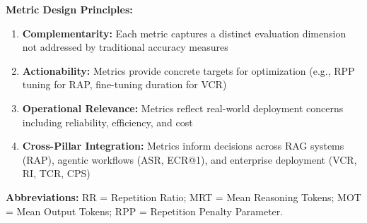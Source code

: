\textbf{Metric Design Principles:}

\begin{enumerate}[leftmargin=*]
    \item \textbf{Complementarity:} Each metric captures a distinct evaluation dimension not addressed by traditional accuracy measures
    \item \textbf{Actionability:} Metrics provide concrete targets for optimization (e.g., RPP tuning for RAP, fine-tuning duration for VCR)
    \item \textbf{Operational Relevance:} Metrics reflect real-world deployment concerns including reliability, efficiency, and cost
    \item \textbf{Cross-Pillar Integration:} Metrics inform decisions across RAG systems (RAP), agentic workflows (ASR, ECR@1), and enterprise deployment (VCR, RI, TCR, CPS)
\end{enumerate}

\textbf{Abbreviations:} RR = Repetition Ratio; MRT = Mean Reasoning Tokens; MOT = Mean Output Tokens; RPP = Repetition Penalty Parameter.